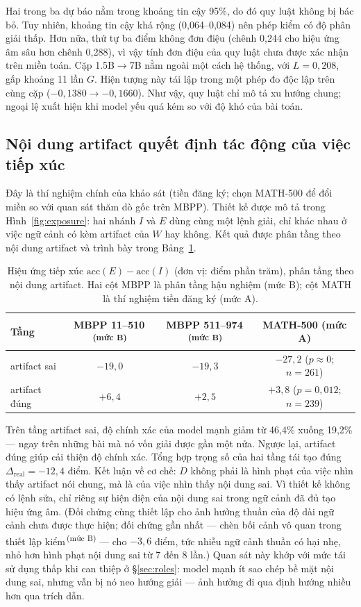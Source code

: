 \documentclass[11pt,a4paper]{article}
\newcommand{\mucB}{\textsuperscript{\,(mức B)}}
\newcommand{\dhonest}{\Delta_{\mathrm{real}}}
\newcommand{\acc}{\mathrm{acc}}
\begin{document}
Hai trong ba dự báo nằm trong khoảng tin cậy 95\%, do đó quy luật không bị bác bỏ. Tuy nhiên, khoảng tin cậy khá rộng (0,064--0,084) nên phép kiểm có độ phân giải thấp. Hơn nữa, thứ tự ba điểm không đơn điệu (chênh 0,244 cho hiệu ứng âm sâu hơn chênh 0,288), vì vậy tính đơn điệu của quy luật chưa được xác nhận trên miền toán. Cặp 1.5B$\to$7B nằm ngoài một cách hệ thống, với $L = 0{,}208$, gấp khoảng 11 lần $G$. Hiện tượng này tái lập trong một phép đo độc lập trên cùng cặp ($-0{,}1380 \to -0{,}1660$). Như vậy, quy luật chỉ mô tả xu hướng chung; ngoại lệ xuất hiện khi model yếu quá kém so với độ khó của bài toán.

\subsection{Nội dung artifact quyết định tác động của việc tiếp xúc}\label{sec:termL}

Đây là thí nghiệm chính của khảo sát (tiền đăng ký; chọn MATH-500 để đổi miền so với quan sát thăm dò gốc trên MBPP). Thiết kế được mô tả trong Hình~\ref{fig:exposure}: hai nhánh $I$ và $E$ dùng cùng một lệnh giải, chỉ khác nhau ở việc ngữ cảnh có kèm artifact của $W$ hay không. Kết quả được phân tầng theo nội dung artifact và trình bày trong Bảng~\ref{tab:exposure}.

\begin{table}[htbp]
\centering
\small
\begin{tabular}{@{}l c c c@{}}
\toprule
Tầng & MBPP 11--510\mucB & MBPP 511--974\mucB & MATH-500 (mức A)\\
\midrule
artifact sai  & $-19{,}0$ & $-19{,}3$ & $-27{,}2$ ($p\approx 0$; $n=261$)\\
artifact đúng & $+6{,}4$ & $+2{,}5$ & $+3{,}8$ ($p=0{,}012$; $n=239$)\\
\bottomrule
\end{tabular}
\caption{Hiệu ứng tiếp xúc $\acc(E)-\acc(I)$ (đơn vị: điểm phần trăm), phân tầng theo nội dung artifact. Hai cột MBPP là phân tầng hậu nghiệm (mức B); cột MATH là thí nghiệm tiền đăng ký (mức A).}
\label{tab:exposure}
\end{table}

Trên tầng artifact sai, độ chính xác của model mạnh giảm từ 46,4\% xuống 19,2\% --- ngay trên những bài mà nó vốn giải được gần một nửa. Ngược lại, artifact đúng giúp cải thiện độ chính xác. Tổng hợp trọng số của hai tầng tái tạo đúng $\dhonest = -12{,}4$ điểm. Kết luận về cơ chế: $D$ không phải là hình phạt của việc nhìn thấy artifact nói chung, mà là của việc nhìn thấy nội dung sai. Vì thiết kế không có lệnh sửa, chỉ riêng sự hiện diện của nội dung sai trong ngữ cảnh đã đủ tạo hiệu ứng âm. (Đối chứng cùng thiết lập cho ảnh hưởng thuần của độ dài ngữ cảnh chưa được thực hiện; đối chứng gần nhất --- chèn bối cảnh vô quan trong thiết lập kiểm\mucB{} --- cho $-3{,}6$ điểm, tức nhiễu ngữ cảnh thuần có hại nhẹ, nhỏ hơn hình phạt nội dung sai từ 7 đến 8 lần.) Quan sát này khớp với mức tái sử dụng thấp khi can thiệp ở \S\ref{sec:roles}: model mạnh ít sao chép bề mặt nội dung sai, nhưng vẫn bị nó neo hướng giải --- ảnh hưởng đi qua định hướng nhiều hơn qua trích dẫn.
\end{document}

